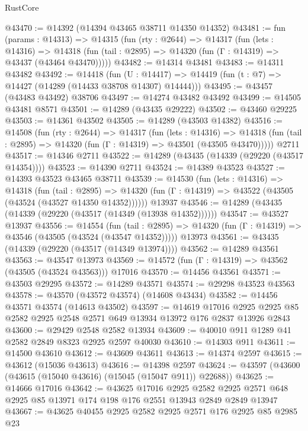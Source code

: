 \begin{lexlean}{RustCore}
\begin{coremodule}
@43470 := @14392 (@14394 @43465 @38711 @14350 @14352)
@43481 := fun (params : @14313) =>
  @14315
    (fun (rty : @2644) =>
    @14317
      (fun (lets : @14316) =>
      @14318 (fun (tail : @2895) => @14320 (fun (Γ : @14319) => @43437 (@43464 @43470)))))
@43482 := @14314 @43481
@43483 := @14311 @43482
@43492 := @14418
    (fun (U : @14417) => @14419 (fun (t : @7) => @14427 (@14289 (@14433 @38708 @14307) @14444)))
@43495 := @43457 (@43483 @43492) @38706
@43497 := @14274 @43482 @43492
@43499 := @14505 @43481 @8571
@43501 := @14289 (@43435 @29222)
@43502 := @43460 @29225
@43503 := @14361 @43502
@43505 := @14289 (@43503 @14382)
@43516 := @14508
    (fun (rty : @2644) =>
    @14317
      (fun (lets : @14316) =>
      @14318 (fun (tail : @2895) => @14320 (fun (Γ : @14319) => @43501 (@43505 @43470)))))
    @2711
@43517 := @14346 @2711
@43522 := @14289 (@43435 (@14339 (@29220 (@43517 @14354))))
@43523 := @14390 @2711
@43524 := @14389 @43523
@43527 := @14393 @43523 @43465 @38711
@43539 := @14530
    (fun (lets : @14316) =>
    @14318
      (fun (tail : @2895) =>
      @14320 (fun (Γ : @14319) => @43522 (@43505 (@43524 (@43527 @14350 @14352))))))
    @13937
@43546 := @14289 (@43435 (@14339 (@29220 (@43517 (@14349 (@13938 @14352))))))
@43547 := @43527 @13937
@43556 := @14554
    (fun (tail : @2895) => @14320 (fun (Γ : @14319) => @43546 (@43505 (@43524 (@43547 @14352)))))
    @13973
@43561 := @43435 (@14339 (@29220 (@43517 (@14349 @13974))))
@43562 := @14289 @43561
@43563 := @43547 @13973
@43569 := @14572 (fun (Γ : @14319) => @43562 (@43505 (@43524 @43563))) @17016
@43570 := @14456 @43561
@43571 := @43503 @29295
@43572 := @14289 @43571
@43574 := @29298 @43523 @43563
@43578 := @43570 (@43572 @43574) (@14608 @43434)
@43582 := @14456 @43571 @43574 (@14613 @43502)
@43597 := @14619
    @17016
    @2925
    @2925
    @85
    @2582
    @2925
    @2548
    @2571
    @649
    @13934
    @13972
    @176
    @2837
    @13926
    @2843
@43600 := @29429 @2548 @2582 @13934
@43609 := @40010 @911 @1289 @41 @2582 @2849 @8323 @2925 @2597 @40030
@43610 := @14303 @911
@43611 := @14500 @43610
@43612 := @43609 @43611
@43613 := @14374 @2597
@43615 := @43612 (@15036 @43613)
@43616 := @14398 @2597
@43624 := @43597 (@43600 (@43615 (@15040 @43616) (@15045 (@15047 @911)) @22688))
@43625 := @14666 @17016
@43642 := @43625
    @17016
    @2925
    @2582
    @2925
    @2571
    @648
    @2925
    @85
    @13971
    @174
    @198
    @176
    @2551
    @13943
    @2849
    @2849
    @13947
@43667 := @43625
    @40455
    @2925
    @2582
    @2925
    @2571
    @176
    @2925
    @85
    @2985
    @23

\end{coremodule}
\end{lexlean}

